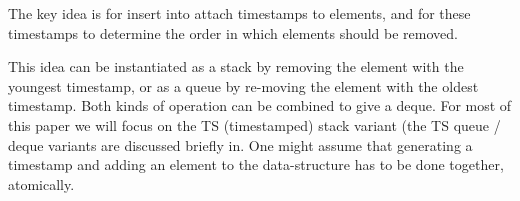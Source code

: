 The key idea is for insert into attach timestamps to elements, and for these
timestamps to determine the order in which elements should be removed.

This idea can be instantiated as a stack by removing the element with the
youngest timestamp, or as a queue by re-moving the element with the oldest
timestamp. 
Both kinds of operation can be combined to give a deque. 
For most of this paper we will focus on the TS (timestamped) stack variant (the
TS queue / deque variants are discussed briefly in. 
One might assume that generating a timestamp and adding an element to the
data-structure has to be done together, atomically. 

